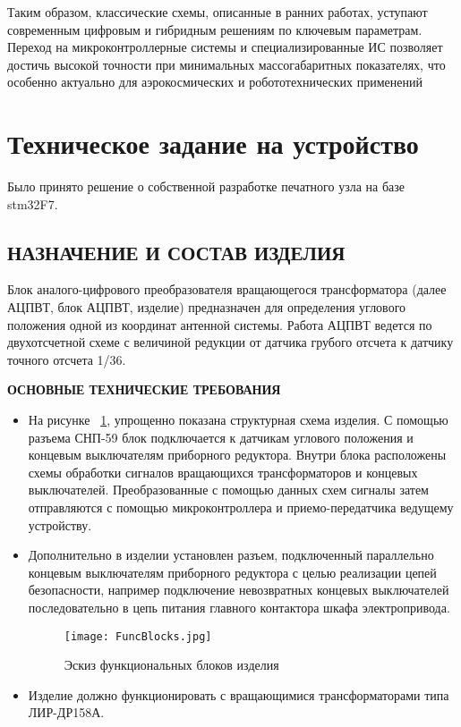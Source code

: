 Таким образом, классические схемы, описанные в ранних работах, уступают современным цифровым и гибридным решениям по ключевым параметрам. 
Переход на микроконтроллерные системы и специализированные ИС позволяет достичь высокой точности при минимальных массогабаритных показателях, 
что особенно актуально для аэрокосмических и робототехнических применений



\section{Техническое задание на устройство}

Было принято решение о собственной разработке печатного узла на базе stm32F7.


\subsection{НАЗНАЧЕНИЕ И СОСТАВ ИЗДЕЛИЯ}

Блок аналого-цифрового преобразователя вращающегося трансформатора (далее АЦПВТ, блок АЦПВТ, изделие) предназначен для определения углового положения одной из координат антенной системы. 
Работа АЦПВТ ведется по двухотсчетной схеме с величиной редукции от датчика грубого отсчета к датчику точного отсчета 1/36.  

\textbf{ОСНОВНЫЕ ТЕХНИЧЕСКИЕ ТРЕБОВАНИЯ}

\begin{itemize}
    \item На рисунке ~\ref{FuncBlocks}, упрощенно показана структурная схема изделия. 
          С помощью разъема СНП-59 блок подключается к датчикам углового положения и концевым выключателям приборного редуктора. 
          Внутри блока расположены схемы обработки сигналов вращающихся трансформаторов и концевых выключателей. 
          Преобразованные с помощью данных схем сигналы затем отправляются с помощью микроконтроллера и приемо-передатчика ведущему устройству.  

    \item Дополнительно в изделии установлен разъем, подключенный параллельно концевым выключателям приборного редуктора с целью реализации цепей безопасности, 
          например подключение невозвратных концевых выключателей последовательно в цепь питания главного контактора шкафа электропривода. 

        \begin{figure}[!t]
          \centering
          \texttt{[image: FuncBlocks.jpg]} 
          \caption{Эскиз функциональных блоков изделия}
          \label{FuncBlocks}
        \end{figure}

    \item Изделие должно функционировать с вращающимися трансформаторами типа ЛИР-ДР158А.
      \end{itemize}


